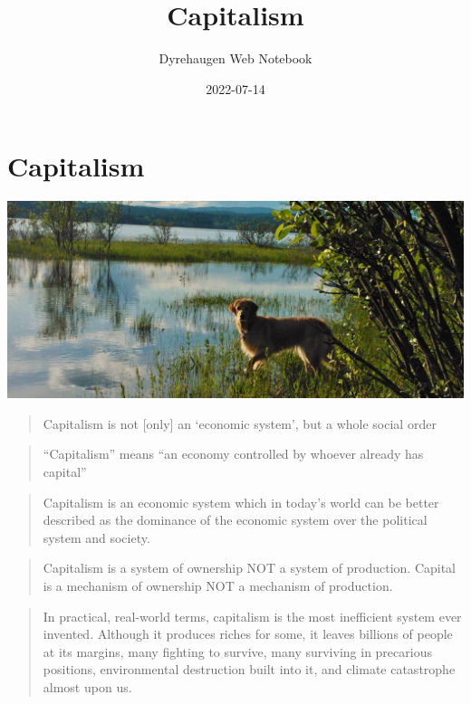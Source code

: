 \documentclass[
]{book}
\title{Capitalism}
\author{Dyrehaugen Web Notebook}
\date{2022-07-14}
\begin{document}
\maketitle

{
\setcounter{tocdepth}{1}
\tableofcontents
}
\hypertarget{capitalism}{%
\chapter{Capitalism}\label{capitalism}}

\includegraphics{fig/zelda.jpg}

\begin{quote}
Capitalism is not {[}only{]} an `economic system', but a whole social order
\end{quote}

\begin{quote}
``Capitalism'' means ``an economy controlled by whoever already has capital''
\end{quote}

\begin{quote}
Capitalism is an economic system which in today's world can be better described as the dominance of the economic system over the political system and society.
\end{quote}

\begin{quote}
Capitalism is a system of ownership NOT a system of production. Capital is a mechanism of ownership NOT a mechanism of production.
\end{quote}

\begin{quote}
In practical, real-world terms, capitalism is the most inefficient system ever invented. Although it produces riches for some, it leaves billions of people at its margins, many fighting to survive, many surviving in precarious positions, environmental destruction built into it, and climate catastrophe almost upon us.
\end{quote}
\end{document}
